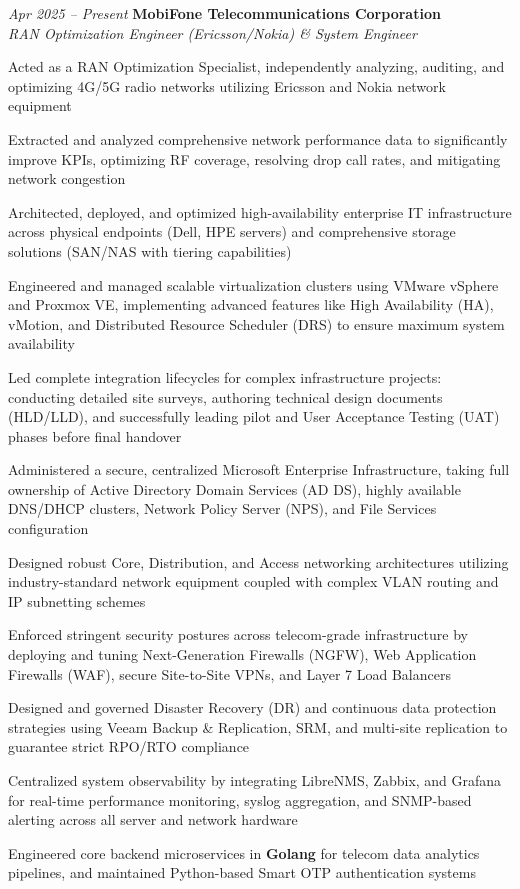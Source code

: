 \begin{twocolentry}{\textit{Apr 2025 -- Present}}
    \textbf{MobiFone Telecommunications Corporation} \\[4pt]
    \textit{RAN Optimization Engineer (Ericsson/Nokia) \& System Engineer}
\end{twocolentry}
\begin{onecolentry}
    \begin{highlights}
        \item Acted as a RAN Optimization Specialist, independently analyzing, auditing, and optimizing 4G/5G radio networks utilizing Ericsson and Nokia network equipment
        \item Extracted and analyzed comprehensive network performance data to significantly improve KPIs, optimizing RF coverage, resolving drop call rates, and mitigating network congestion
        \item Architected, deployed, and optimized high-availability enterprise IT infrastructure across physical endpoints (Dell, HPE servers) and comprehensive storage solutions (SAN/NAS with tiering capabilities)
        \item Engineered and managed scalable virtualization clusters using VMware vSphere and Proxmox VE, implementing advanced features like High Availability (HA), vMotion, and Distributed Resource Scheduler (DRS) to ensure maximum system availability
        \item Led complete integration lifecycles for complex infrastructure projects: conducting detailed site surveys, authoring technical design documents (HLD/LLD), and successfully leading pilot and User Acceptance Testing (UAT) phases before final handover
        \item Administered a secure, centralized Microsoft Enterprise Infrastructure, taking full ownership of Active Directory Domain Services (AD DS), highly available DNS/DHCP clusters, Network Policy Server (NPS), and File Services configuration
        \item Designed robust Core, Distribution, and Access networking architectures utilizing industry-standard network equipment coupled with complex VLAN routing and IP subnetting schemes
        \item Enforced stringent security postures across telecom-grade infrastructure by deploying and tuning Next-Generation Firewalls (NGFW), Web Application Firewalls (WAF), secure Site-to-Site VPNs, and Layer 7 Load Balancers
        \item Designed and governed Disaster Recovery (DR) and continuous data protection strategies using Veeam Backup \& Replication, SRM, and multi-site replication to guarantee strict RPO/RTO compliance
        \item Centralized system observability by integrating LibreNMS, Zabbix, and Grafana for real-time performance monitoring, syslog aggregation, and SNMP-based alerting across all server and network hardware
        \item Engineered core backend microservices in \textbf{Golang} for telecom data analytics pipelines, and maintained Python-based Smart OTP authentication systems
    \end{highlights}
\end{onecolentry}
